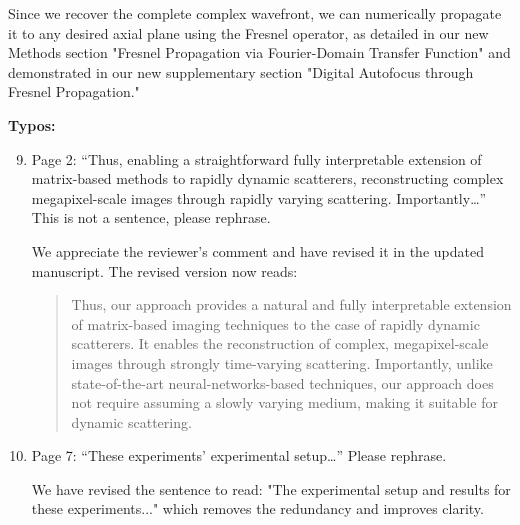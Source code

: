 \documentclass[12pt]{article}
\newenvironment{solved_reviewercomment}
    {\begin{tcolorbox}[width=\linewidth,colback=gray!5,colframe=solved_commentcolor!50,title=Reviewer Comment,left=5pt,right=5pt]}
    {\end{tcolorbox}}
\newenvironment{ourresponse}
    {\begin{tcolorbox}[width=\linewidth,breakable,enhanced,colback=gray!5,colframe=responsecolor!50,title=Response,left=5pt,right=5pt]}
    {\end{tcolorbox}}
\begin{document}
\begin{enumerate}[label=\arabic*.]
\begin{ourresponse}
        Since we recover the complete complex wavefront, we can numerically propagate it to any desired axial plane using the Fresnel operator, as detailed in our new Methods section "Fresnel Propagation via Fourier-Domain Transfer Function" and demonstrated in our new supplementary section "Digital Autofocus through Fresnel Propagation."
    \end{ourresponse}



\end{enumerate}

\textbf{Typos:}
\begin{enumerate}[label=\arabic*.]
    \setcounter{enumi}{8}
    \item  \leavevmode\vspace{-\baselineskip}
    \begin{solved_reviewercomment}
        Page 2: “Thus, enabling a straightforward fully interpretable extension of matrix-based methods to rapidly dynamic scatterers, reconstructing complex megapixel-scale images through rapidly varying scattering. Importantly…” This is not a sentence, please rephrase.
    \end{solved_reviewercomment}

    \begin{ourresponse}
        We appreciate the reviewer’s comment and have revised it in the updated manuscript. The revised version now reads:
        
        \begin{quote}
            Thus, our approach provides a natural and fully interpretable extension of matrix-based imaging techniques to the case of rapidly dynamic scatterers. It enables the reconstruction of complex, megapixel-scale images through strongly time-varying scattering. Importantly, unlike state-of-the-art neural-networks-based techniques, our approach does not require assuming a slowly varying medium, making it suitable for dynamic scattering.
        \end{quote}
        
    \end{ourresponse}



    \item  \leavevmode\vspace{-\baselineskip}
    \begin{solved_reviewercomment}
        Page 7: “These experiments’ experimental setup…” Please rephrase.
    \end{solved_reviewercomment}
    \begin{ourresponse}
        We have revised the sentence to read: "The experimental setup and results for these experiments..." which removes the redundancy and improves clarity.
    \end{ourresponse}
    
\end{enumerate}
\end{document}
